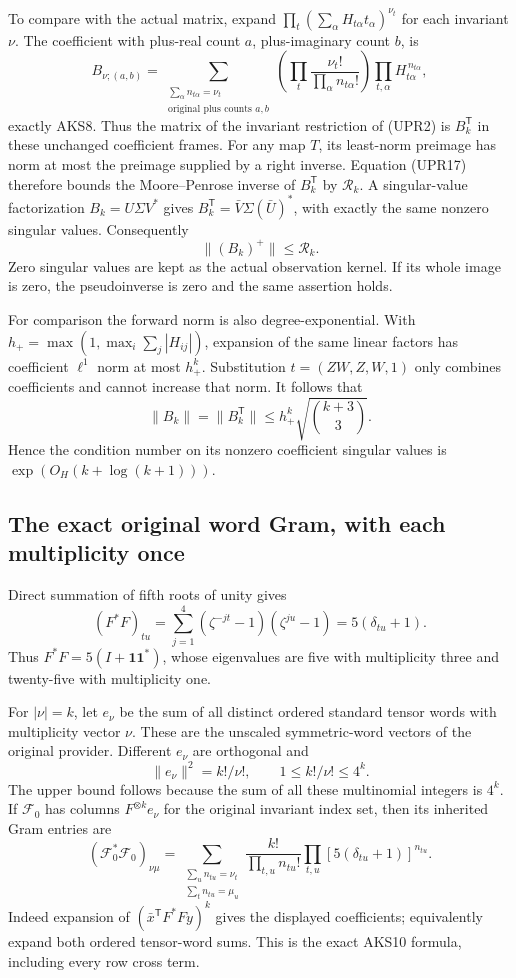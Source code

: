 To compare with the actual matrix, expand
\(\prod_t(\sum_\alpha H_{t\alpha}t_\alpha)^{\nu_t}\)
for each invariant \(\nu\).
The coefficient with plus-real count \(a\), plus-imaginary count
\(b\), is
\[
B_{\nu;(a,b)}
=\sum_{\substack{\sum_\alpha n_{t\alpha}=\nu_t\\
                  \text{original plus counts }a,b}}
\left(\prod_t\frac{\nu_t!}{\prod_\alpha n_{t\alpha}!}\right)
\prod_{t,\alpha}H_{t\alpha}^{\,n_{t\alpha}},
\tag{UPR18}
\]
exactly AKS8.  Thus the matrix of the invariant restriction of
(UPR2) is \(B_k^{\mathsf T}\) in these unchanged coefficient frames.
For any map \(T\), its least-norm preimage has norm at most the
preimage supplied by a right inverse.  Equation (UPR17) therefore
bounds the Moore--Penrose inverse of \(B_k^{\mathsf T}\) by
\(\mathscr R_k\).  A singular-value factorization
\(B_k=U\Sigma V^*\) gives
\(B_k^{\mathsf T}=\bar V\Sigma(\bar U)^*\), with exactly the
same nonzero singular values.  Consequently
\[
\|(B_k)^+\|\le\mathscr R_k.
\tag{UPR19}
\]
Zero singular values are kept as the actual observation kernel.
If its whole image is zero, the pseudoinverse is zero and the
same assertion holds.

For comparison the forward norm is also degree-exponential.
With \(h_+=\max(1,\max_i\sum_j|H_{ij}|)\), expansion of the same
linear factors has coefficient \(\ell^1\) norm at most \(h_+^k\).
Substitution \(t=(ZW,Z,W,1)\) only combines coefficients and cannot
increase that norm.  It follows that
\[
\|B_k\|=\|B_k^{\mathsf T}\|
\le h_+^k\sqrt{\binom{k+3}{3}}.
\tag{UPR20}
\]
Hence the condition number on its nonzero coefficient singular
values is \(\exp(O_H(k+\log(k+1)))\).

\subsection{The exact original word Gram, with each multiplicity once}
Direct summation of fifth roots of unity gives
\[
(F^*F)_{tu}
=\sum_{j=1}^4(\zeta^{-jt}-1)(\zeta^{ju}-1)
=5(\delta_{tu}+1).
\tag{UPR21}
\]
Thus \(F^*F=5(I+\mathbf1\mathbf1^*)\), whose eigenvalues are
five with multiplicity three and twenty-five with multiplicity one.

For \(|\nu|=k\), let \(e_\nu\) be the sum of all distinct ordered
standard tensor words with multiplicity vector \(\nu\).
These are the unscaled symmetric-word vectors of the original
provider.  Different \(e_\nu\) are orthogonal and
\[
\|e_\nu\|^2=k!/\nu!,\qquad
1\le k!/\nu!\le4^k.
\tag{UPR22}
\]
The upper bound follows because the sum of all these multinomial
integers is \(4^k\).
If \(\mathcal F_0\) has columns \(F^{\otimes k}e_\nu\) for the
original invariant index set, then its inherited Gram entries are
\[
(\mathcal F_0^*\mathcal F_0)_{\nu\mu}
=\sum_{\substack{\sum_u n_{tu}=\nu_t\\
                  \sum_t n_{tu}=\mu_u}}
\frac{k!}{\prod_{t,u}n_{tu}!}
\prod_{t,u}[5(\delta_{tu}+1)]^{n_{tu}}.
\tag{UPR23}
\]
Indeed expansion of
\((\bar x^{\mathsf T}F^*Fy)^k\) gives the displayed coefficients;
equivalently expand both ordered tensor-word sums.
This is the exact AKS10 formula, including every row cross term.

